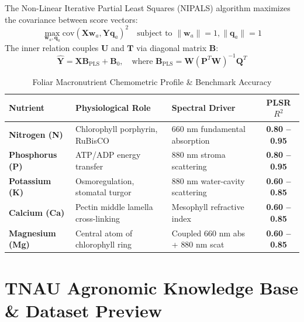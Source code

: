 \documentclass[9pt,twocolumn,a4paper,landscape]{article}
\begin{document}
The Non-Linear Iterative Partial Least Squares (NIPALS) algorithm maximizes the covariance between score vectors:
\begin{equation}
    \max_{\mathbf{w}_a, \mathbf{q}_a} \text{cov}(\mathbf{X} \mathbf{w}_a, \mathbf{Y} \mathbf{q}_a)^2 \quad \text{subject to } \|\mathbf{w}_a\| = 1, \|\mathbf{q}_a\| = 1
    \label{eq:nipals}
\end{equation}
The inner relation couples $\mathbf{U}$ and $\mathbf{T}$ via diagonal matrix $\mathbf{B}$:
\begin{equation}
    \hat{\mathbf{Y}} = \mathbf{X} \mathbf{B}_{\text{PLS}} + \mathbf{B}_0, \quad \text{where } \mathbf{B}_{\text{PLS}} = \mathbf{W}(\mathbf{P}^T \mathbf{W})^{-1} \mathbf{Q}^T
    \label{eq:plsr_predict}
\end{equation}

\begin{table}[htbp]
\centering
\caption{Foliar Macronutrient Chemometric Profile \& Benchmark Accuracy}
\label{tab:plsr_results}
\scriptsize
\begin{tabularx}{\columnwidth}{l p{2.8cm} p{2.8cm} c}
\toprule
\textbf{Nutrient} & \textbf{Physiological Role} & \textbf{Spectral Driver} & \textbf{PLSR $R^2$} \\
\midrule
\textbf{Nitrogen (N)} & Chlorophyll porphyrin, RuBisCO & $660\text{ nm}$ fundamental absorption & \textbf{0.80 -- 0.95} \\
\textbf{Phosphorus (P)} & ATP/ADP energy transfer & $880\text{ nm}$ stroma scattering & \textbf{0.80 -- 0.95} \\
\textbf{Potassium (K)} & Osmoregulation, stomatal turgor & $880\text{ nm}$ water-cavity scattering & \textbf{0.60 -- 0.85} \\
\textbf{Calcium (Ca)} & Pectin middle lamella cross-linking & Mesophyll refractive index & \textbf{0.60 -- 0.85} \\
\textbf{Magnesium (Mg)} & Central atom of chlorophyll ring & Coupled $660\text{ nm}$ abs + $880\text{ nm}$ scat & \textbf{0.60 -- 0.85} \\
\bottomrule
\end{tabularx}
\end{table}

\section{TNAU Agronomic Knowledge Base \& Dataset Preview}
\label{sec:tnau_db}
\end{document}
